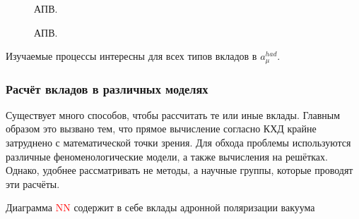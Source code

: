 \begin{figure}[htbp]
\begin{minipage}[t]{0.24\textwidth}
        \label{diag:lbl}
        \caption{АПВ.}
    \end{minipage}
    \hfill
    \begin{minipage}[t]{0.24\textwidth}
        \centering
        \label{diag:lbl_Pg}
        \caption{АПВ.}
    \end{minipage}
\end{figure}


Изучаемые процессы интересны для всех типов вкладов в $a_\mu^{had}$. 

\subsubsection{Расчёт вкладов в различных
моделях}\label{contribution-calculation}

Существует много способов, чтобы рассчитать те или иные вклады. Главным
образом это вызвано тем, что прямое вычисление согласно КХД крайне
затруднено с математической точки зрения. Для обхода проблемы
используются различные феноменологические модели, а также вычисления на
решётках. Однако, удобнее рассматривать не методы, а научные группы,
которые проводят эти расчёты.

Диаграмма \textcolor{red}{NN} содержит в себе вклады адронной поляризации вакуума 



